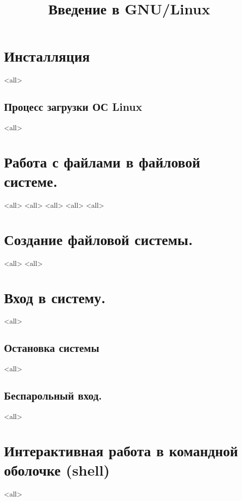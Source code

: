 

\title{Введение в GNU/Linux}




\begin{frame}
	\frametitle{}
	\titlepage
	\vspace{-0.5cm}
	\begin{center}
	\end{center}
\end{frame}


\begin{frame}
	\tableofcontents
	[hideallsubsections]
\end{frame}


\section{Инсталляция}
\mode<all>{}
\subsection{Процесс загрузки ОС Linux}
\mode<all>{}

\section{Работа с файлами в файловой системе.}
\mode<all>{}
\mode<all>{}
\mode<all>{}
\mode<all>{}
\mode<all>{}
\section{Создание файловой системы.}
\mode<all>{}
\mode<all>{}

\section{Вход в систему.}
\mode<all>{}
\subsection{Остановка системы}
\mode<all>{}

\subsection{Беспарольный вход.}
\mode<all>{}
\section{Интерактивная работа в командной оболочке (shell)}
\mode<all>{}

\bye
